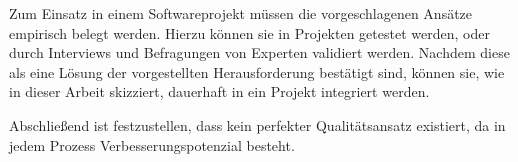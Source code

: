         Zum Einsatz in einem Softwareprojekt müssen die vorgeschlagenen Ansätze empirisch belegt werden. Hierzu können sie in Projekten getestet werden, oder durch Interviews und Befragungen von Experten validiert werden. Nachdem diese als eine Lösung der vorgestellten Herausforderung bestätigt sind, können sie, wie in dieser Arbeit skizziert, dauerhaft in ein Projekt integriert werden.
        
        Abschließend ist festzustellen, dass kein perfekter Qualitätsansatz existiert, da in jedem Prozess Verbesserungspotenzial besteht.